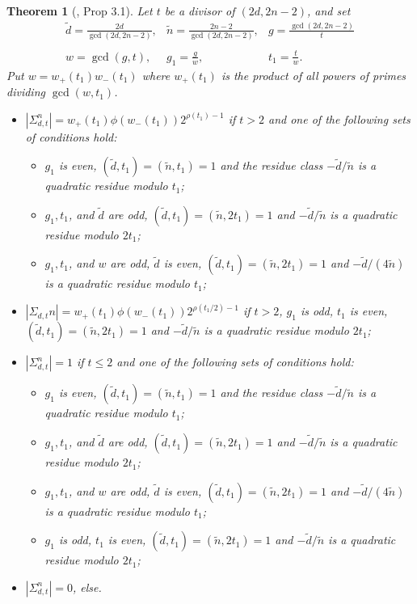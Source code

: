 \documentclass{article}
\newtheorem{theorem}[proposition]{Theorem}
\begin{document}
\begin{theorem}[\cite{zbMATH06387271}, Prop 3.1]\label{theo_count_connected_components_hilb_k3}
    Let $t$ be a divisor of $(2d, 2n-2)$, and set 
    \begin{equation}
\begin{array}{lll}
\tilde{d}=\frac{2d}{\gcd(2d,2n-2)}, & \tilde{n}=\frac{2n-2}{\gcd(2d,2n-2)}, & g=\frac{\gcd(2d,2n-2)}{t} \\
 & & \\
w=\gcd(g,t), & g_1=\frac{g}{w}, & t_1=\frac{t}{w}.
\end{array}
\end{equation}
Put $w=w_+(t_1)w_-(t_1)$ where $w_+(t_1)$ is the product of all powers of primes dividing $\gcd(w, t_1)$.

     \begin{itemize}
       \item $|\Sigma_{d,t}^n|=w_+(t_1)\phi(w_-(t_1))2^{\rho(t_1)-1}$ if $t>2$ and one of the following sets of conditions hold: 
       \begin{itemize}
           \item[(i)] $g_1$ is even, $(\tilde{d}, t_1)=(\tilde{n}, t_1)=1$ and the residue class $-\tilde{d}/\tilde{n}$ is a quadratic residue modulo $t_1$;
           \item[(ii)] $g_1, t_1$, and $\tilde{d}$ are odd, $(\tilde{d}, t_1)=(\tilde{n}, 2t_1)=1$ and $-\tilde{d}/\tilde{n}$ is a quadratic residue modulo $2t_1$;
           \item[(iii)] $g_1, t_1$, and $w$ are odd, $\tilde{d}$ is even, $(\tilde{d}, t_1)=(\tilde{n}, 2t_1)=1$ and $-\tilde{d}/(4\tilde{n})$ is a quadratic residue modulo $t_1$;
       \end{itemize}
       \item $|\Sigma_{d,t}n|=w_+(t_1)\phi(w_-(t_1))2^{\rho(t_1/2)-1}$ if $t>2$, $g_1$ is odd, $t_1$ is even, $(\tilde{d}, t_1)=(\tilde{n}, 2t_1)=1$ and $-\tilde{d}/\tilde{n}$ is a quadratic residue modulo $2t_1$;
       \item $|\Sigma_{d,t}^n|=1$ if $t\leq 2$ and one of the following sets of conditions hold: 
       \begin{itemize}
           \item[(i)] $g_1$ is even, $(\tilde{d}, t_1)=(\tilde{n}, t_1)=1$ and the residue class $-\tilde{d}/\tilde{n}$ is a quadratic residue modulo $t_1$;
           \item[(ii)] $g_1, t_1$, and $\tilde{d}$ are odd, $(\tilde{d}, t_1)=(\tilde{n}, 2t_1)=1$ and $-\tilde{d}/\tilde{n}$ is a quadratic residue modulo $2t_1$; 
           \item[(iii)] $g_1, t_1$, and $w$ are odd, $\tilde{d}$ is even, $(\tilde{d}, t_1)=(\tilde{n}, 2t_1)=1$ and $-\tilde{d}/(4\tilde{n})$ is a quadratic residue modulo $t_1$;
           \item[(iv)] $g_1$ is odd, $t_1$ is even, $(\tilde{d}, t_1)=(\tilde{n}, 2t_1)=1$ and $-\tilde{d}/\tilde{n}$ is a quadratic residue modulo $2t_1$;
       \end{itemize}
       \item $|\Sigma_{d,t}^n|=0$, else.
     \end{itemize}
\end{theorem}
\end{document}
